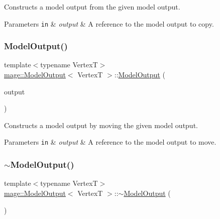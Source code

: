 Constructs a model output from the given model output.


\begin{DoxyParams}[1]{Parameters}
\mbox{\tt in}  & {\em output} & A reference to the model output to copy. \\
\hline
\end{DoxyParams}
\hypertarget{structmage_1_1_model_output_a20faa6e5b76ec7903a09e222e61e5353}{}\label{structmage_1_1_model_output_a20faa6e5b76ec7903a09e222e61e5353} 
\subsubsection{\texorpdfstring{Model\+Output()}{ModelOutput()}\hspace{0.1cm}{\footnotesize\ttfamily [3/3]}}
{\footnotesize\ttfamily template$<$typename VertexT$>$ \\
\hyperlink{structmage_1_1_model_output}{mage\+::\+Model\+Output}$<$ VertexT $>$\+::\hyperlink{structmage_1_1_model_output}{Model\+Output} (\begin{DoxyParamCaption}\item[{\hyperlink{structmage_1_1_model_output}{Model\+Output}$<$ VertexT $>$ \&\&}]{output }\end{DoxyParamCaption})\hspace{0.3cm}{\ttfamily [default]}}

Constructs a model output by moving the given model output.


\begin{DoxyParams}[1]{Parameters}
\mbox{\tt in}  & {\em output} & A reference to the model output to move. \\
\hline
\end{DoxyParams}
\hypertarget{structmage_1_1_model_output_a69a7f27486ad287943cbf973107ad8e1}{}\label{structmage_1_1_model_output_a69a7f27486ad287943cbf973107ad8e1} 
\subsubsection{\texorpdfstring{$\sim$\+Model\+Output()}{~ModelOutput()}}
{\footnotesize\ttfamily template$<$typename VertexT$>$ \\
\hyperlink{structmage_1_1_model_output}{mage\+::\+Model\+Output}$<$ VertexT $>$\+::$\sim$\hyperlink{structmage_1_1_model_output}{Model\+Output} (\begin{DoxyParamCaption}{ }\end{DoxyParamCaption})\hspace{0.3cm}{\ttfamily [default]}}

